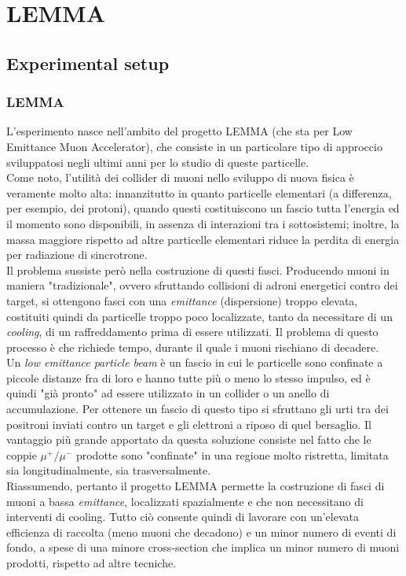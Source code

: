 \documentclass[a4paper,11pt]{book}
\begin{document}
\part{LEMMA}

\chapter{Experimental setup}

\section{LEMMA}

L'esperimento nasce nell'ambito del progetto LEMMA (che sta per Low Emittance Muon Accelerator), che consiste in un particolare tipo di approccio sviluppatosi negli ultimi anni per lo studio di queste particelle.\\
Come noto, l'utilità dei collider di muoni nello sviluppo di nuova fisica è veramente molto alta: innanzitutto in quanto particelle elementari (a differenza, per esempio, dei protoni), quando questi costituiscono un fascio tutta l'energia ed il momento sono disponibili, in assenza di interazioni tra i sottosistemi; inoltre, la massa maggiore rispetto ad altre particelle elementari riduce la perdita di energia per radiazione di sincrotrone.\\
Il problema sussiste però nella costruzione di questi fasci. Producendo muoni in maniera "tradizionale", ovvero sfruttando collisioni di adroni energetici contro dei target, si ottengono fasci con una \textit{emittance} (dispersione) troppo elevata, costituiti quindi da particelle troppo poco localizzate, tanto da necessitare di un \textit{cooling}, di un raffreddamento prima di essere utilizzati. Il problema di questo processo è che richiede tempo, durante il quale i muoni rischiano di decadere.\\
Un \textit{low emittance particle beam} è un fascio in cui le particelle sono confinate a piccole distanze fra di loro e hanno tutte più o meno lo stesso impulso, ed è quindi "già pronto" ad essere utilizzato in un collider o un anello di accumulazione. Per ottenere un fascio di questo tipo si sfruttano gli urti tra dei positroni inviati contro un target e gli elettroni a riposo di quel bersaglio. Il vantaggio più grande apportato da questa soluzione consiste nel fatto che le coppie $\mu^+/\mu^-$ prodotte sono "confinate" in una regione molto ristretta, limitata sia longitudinalmente, sia trasversalmente.\\
Riassumendo, pertanto il progetto LEMMA permette la costruzione di fasci di muoni a bassa \textit{emittance}, localizzati spazialmente e che non necessitano di interventi di cooling. Tutto ciò consente quindi di lavorare con un'elevata efficienza di raccolta (meno muoni che decadono) e un minor numero di eventi di fondo, a spese di una minore cross-section che implica un minor numero di muoni prodotti, rispetto ad altre tecniche.\\
\end{document}
